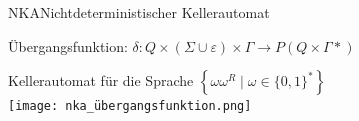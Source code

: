 \begin{concept}{NKA}Nichtdeterministischer Kellerautomat

    Übergangsfunktion: $\delta: Q \times(\Sigma \cup \varepsilon) \times \Gamma \rightarrow P(Q \times \Gamma *)$

    Kellerautomat für die Sprache $\left\{\omega \omega^{R} \mid \omega \in\{0,1\}^{*}\right\}$\\
    \texttt{[image: nka\_übergangsfunktion.png]}
\end{concept}